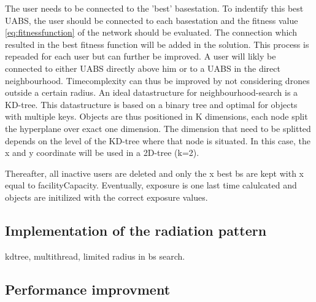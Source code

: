 The user needs to be connected to the 'best' basestation. To indentify this best \gls{UABS}, the user should be connected 
to each basestation and the fitness value \ref{eq:fitnessfunction} of the network should be evaluated. The connection which resulted in the best fitness function
will be added in the solution. This process is repeaded for each user but can further be improved. A user will likly be connected to either 
\gls{UABS} directly above him or to a \gls{UABS} in the direct neighbourhood. Timecomplexity can thus be improved by not considering drones 
outside a certain radius.
An ideal datastructure for neighbourhood-search is a KD-tree. This datastructure is based on a binary tree and optimal for objects with 
multiple keys. Objects are thus positioned in K dimensions, each node split the hyperplane over exact one dimension. The dimension that need 
to be splitted depends on the level of the KD-tree where that node is situated.
In this case, the x and y coordinate will be used in a 2D-tree (k=2).

Thereafter, all inactive users are deleted and only the x best bs are kept with x equal to facilityCapacity.
Eventually, exposure is one last time calulcated and objects are initilized with the correct exposure values.

\subsection{Implementation of the radiation pattern}
kdtree, multithread, limited radius in bs search.


\subsection{Performance improvment}

